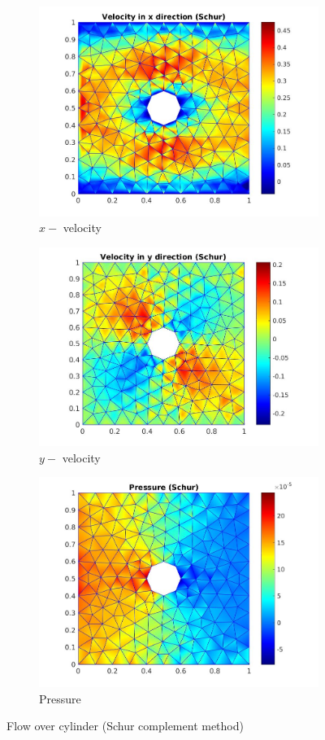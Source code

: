 \documentclass[a4paper,twoside,openright]{book}
\begin{document}
\begin{figure}
\begin{subfigure}{\textwidth}	
    \includegraphics[width=0.8\linewidth]{cylinder_schur_vx.jpg}
    \caption{$x-$ velocity}
    \label{x_vel_stoke_schur}
\end{subfigure}
\begin{subfigure}{\textwidth}	
    \includegraphics[width=0.8\linewidth]{cylinder_schur_vy.jpg}
    \caption{$y-$ velocity}
     \label{y_vel_stoke_schur}
\end{subfigure}
\begin{subfigure}{\textwidth}	
    \includegraphics[width=0.8\linewidth]{cylinder_schur_pressure.jpg}
    \caption{Pressure}
      \label{pressure_stoke_schur}
\end{subfigure}
\caption{Flow over cylinder (Schur complement method)}
\label{flow_over_cylinder_schur}
\end{figure}
\end{document}
